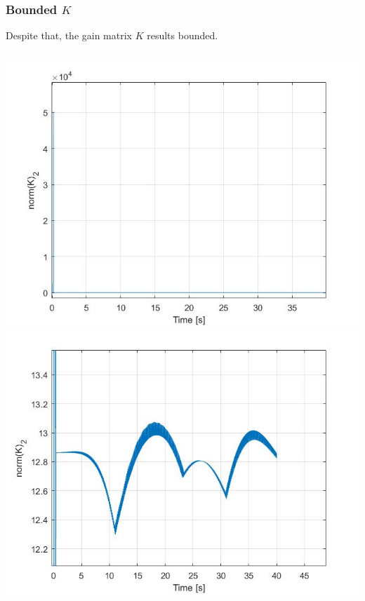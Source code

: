\documentclass{beamer}
\begin{document}
	\begin{frame}
		\frametitle{Bounded $K$}
		Despite that, the gain matrix $K$ results bounded.
		\begin{columns}[t]
			\centering
			\includegraphics[scale=0.25]{kric}\\
			\centering
			\includegraphics[scale=0.25]{kric2}\\
		\end{columns}
	\end{frame}
	
\end{document}
